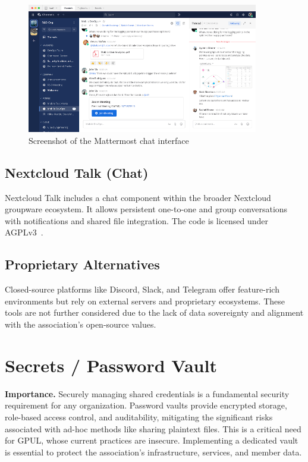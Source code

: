 \begin{figure}[h!]
  \centering
  \includegraphics[width=0.9\textwidth]{imaxes/mattermost-ui.png}
  \caption{Screenshot of the Mattermost chat interface}
  \label{fig:mattermost-ui}
\end{figure}

\subsection*{Nextcloud Talk (Chat)}

Nextcloud Talk includes a chat component within the broader Nextcloud groupware ecosystem. It allows persistent one-to-one and group conversations with notifications and shared file integration. The code is licensed under AGPLv3~\cite{nextcloud-talk-docs}.

\subsection*{Proprietary Alternatives}

Closed-source platforms like Discord, Slack, and Telegram offer feature-rich environments but rely on external servers and proprietary ecosystems. These tools are not further considered due to the lack of data sovereignty and alignment with the association's open-source values.

\section{Secrets / Password Vault}

\textbf{Importance.} Securely managing shared credentials is a fundamental security requirement for any organization. Password vaults provide encrypted storage, role-based access control, and auditability, mitigating the significant risks associated with ad-hoc methods like sharing plaintext files. This is a critical need for GPUL, whose current practices are insecure. Implementing a dedicated vault is essential to protect the association's infrastructure, services, and member data.

